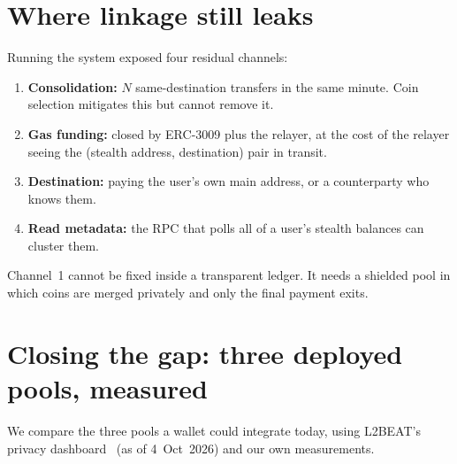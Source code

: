 \documentclass[10pt]{article}
\begin{document}
\section*{Where linkage still leaks}
Running the system exposed four residual channels:
\begin{enumerate}\setlength\itemsep{0em}
\item \textbf{Consolidation:} $N$ same-destination transfers in the same minute. Coin selection mitigates this but cannot remove it.
\item \textbf{Gas funding:} closed by ERC-3009 plus the relayer, at the cost of the relayer seeing the (stealth address, destination) pair in transit.
\item \textbf{Destination:} paying the user's own main address, or a counterparty who knows them.
\item \textbf{Read metadata:} the RPC that polls all of a user's stealth balances can cluster them.
\end{enumerate}
Channel~1 cannot be fixed inside a transparent ledger. It needs a shielded pool in which
coins are merged privately and only the final payment exits.

\section*{Closing the gap: three deployed pools, measured}
We compare the three pools a wallet could integrate today, using L2BEAT's privacy
dashboard~\cite{l2beat} (as of 4~Oct~2026) and our own measurements.

\begin{table}[h]\centering\small
{}
\end{table}
\end{document}
